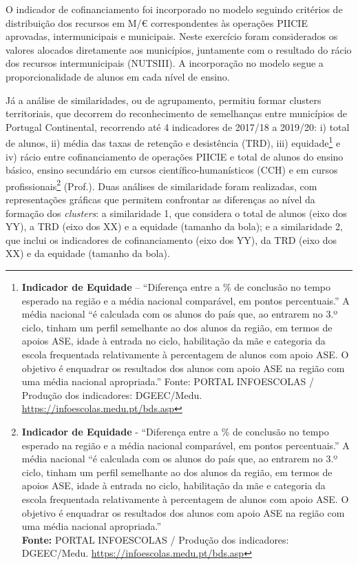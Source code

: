\documentclass[
]{book}
\begin{document}
O indicador de cofinanciamento foi incorporado no modelo seguindo critérios de distribuição dos recursos em M/€ correspondentes às operações PIICIE aprovadas, intermunicipais e municipais. Neste exercício foram considerados os valores alocados diretamente aos municípios, juntamente com o resultado do rácio dos recursos intermunicipais (NUTSIII). A incorporação no modelo segue a proporcionalidade de alunos em cada nível de ensino.

Já a análise de similaridades, ou de agrupamento, permitiu formar clusters territoriais, que decorrem do reconhecimento de semelhanças entre municípios de Portugal Continental, recorrendo até 4 indicadores de 2017/18 a 2019/20: i) total de alunos, ii) média das taxas de retenção e desistência (TRD), iii) equidade\footnote{\textbf{Indicador de Equidade} -- ``Diferença entre a \% de conclusão no tempo esperado na região e a média nacional comparável, em pontos percentuais.'' A média nacional ``é calculada com os alunos do país que, ao entrarem no 3.º ciclo, tinham um perfil semelhante ao dos alunos da região, em termos de apoios ASE, idade à entrada no ciclo, habilitação da mãe e categoria da escola frequentada relativamente à percentagem de alunos com apoio ASE. O objetivo é enquadrar os resultados dos alunos com apoio ASE na região com uma média nacional apropriada.'' Fonte: PORTAL INFOESCOLAS / Produção dos indicadores: DGEEC/Medu. \url{https://infoescolas.medu.pt/bds.asp}} e iv) rácio entre cofinanciamento de operações PIICIE e total de alunos do ensino básico, ensino secundário em cursos científico-humanísticos (CCH) e em cursos profissionais\footnote{\textbf{Indicador de Equidade} - ``Diferença entre a \% de conclusão no tempo esperado na região e a média nacional comparável, em pontos percentuais.'' A média nacional ``é calculada com os alunos do país que, ao entrarem no 3.º ciclo, tinham um perfil semelhante ao dos alunos da região, em termos de apoios ASE, idade à entrada no ciclo, habilitação da mãe e categoria da escola frequentada relativamente à percentagem de alunos com apoio ASE. O objetivo é enquadrar os resultados dos alunos com apoio ASE na região com uma média nacional apropriada.''\\
  \textbf{Fonte:} PORTAL INFOESCOLAS / Produção dos indicadores: DGEEC/Medu. \url{https://infoescolas.medu.pt/bds.asp}} (Prof.). Duas análises de similaridade foram realizadas, com representações gráficas que permitem confrontar as diferenças ao nível da formação dos \emph{clusters}: a similaridade 1, que considera o total de alunos (eixo dos YY), a TRD (eixo dos XX) e a equidade (tamanho da bola); e a similaridade 2, que inclui os indicadores de cofinanciamento (eixo dos YY), da TRD (eixo dos XX) e da equidade (tamanho da bola).
\end{document}
